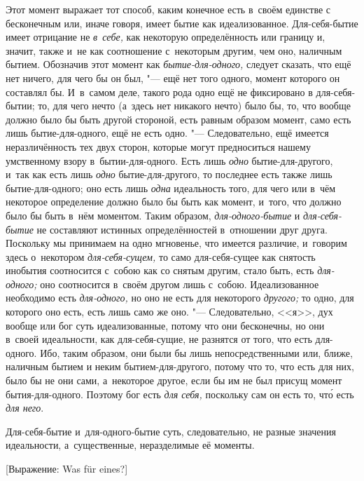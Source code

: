 Этот момент выражает тот способ, каким конечное есть в~своём единстве с
бесконечным или, иначе говоря, имеет бытие как идеализованное.
Для-себя-бытие имеет отрицание не {\em в~себе,} как
некоторую определённость или границу и, значит, также и~не как соотношение
с~некоторым другим, чем оно, наличным бытием. Обозначив этот момент как
{\em бытие-для-одного,} следует сказать, что ещё нет
ничего, для чего бы он был, "--- ещё нет того одного, момент которого он
составлял бы. И~в~самом деле, такого рода одно ещё не фиксировано в
для-себя-бытии; то, для чего нечто (а~здесь нет никакого нечто) было бы,
то, что вообще должно было бы быть другой стороной, есть равным образом
момент, само есть лишь бытие-для-одного, ещё не есть одно. "--- Следовательно,
ещё имеется неразличённость тех двух сторон, которые могут предноситься
нашему умственному взору в~бытии-для-одного. Есть лишь
{\em одно} бытие-для-другого, и~так как есть лишь
{\em одно} бытие-для-другого, то последнее есть также
лишь бытие-для-одного; оно есть лишь {\em одна}
идеальность того, для чего или в~чём некоторое определение должно было бы
быть как момент, и~того, что должно было бы быть в~нём моментом. Таким
образом, {\em для-одного-бытие} и
{\em для-себя-бытие} не составляют истинных
определённостей в~отношении друг друга. Поскольку мы принимаем на одно
мгновенье, что имеется различие, и~говорим здесь о~некотором
{\em для-себя-сущем,} то само для-себя-сущее как
снятость инобытия соотносится с~собою как со снятым другим, стало быть,
есть {\em для-одного;} оно соотносится в~своём другом
лишь с~собою. Идеализованное необходимо есть
{\em для-одного,} но оно не есть для некоторого
{\em другого;} то одно, для которого оно есть, есть
лишь само же оно. "--- Следовательно, <<я>>, дух вообще или бог суть
идеализованные, потому что они бесконечны, но они в~своей идеальности, как
для-себя-сущие, не разнятся от того, что есть для-одного. Ибо, таким
образом, они были бы лишь непосредственными или, ближе, наличным бытием и
неким бытием-для-другого, потому что то, что есть для них, было бы не они
сами, а~некоторое другое, если бы им не был присущ момент бытия-для-одного.
Поэтому бог есть {\em для себя,} поскольку сам он есть
то, чт\'{о} есть {\em для него}.

Для-себя-бытие и~для-одного-бытие суть, следовательно, не разные значения
идеальности, а~существенные, неразделимые её моменты.

%
{[Выражение: Was für eines?]}

